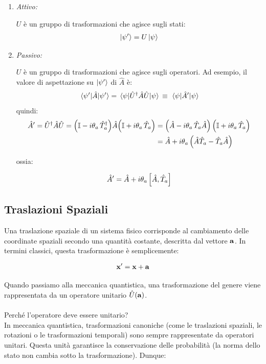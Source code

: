 \begin{enumerate}[label=\arabic*)]
	
	\item \textit{Attivo:}
	
		$U$ è un gruppo di trasformazioni che agisce sugli stati:
	\begin{align*}
		\ket{\psi'} = U \ket{\psi}
	\end{align*}
	
	\item \textit{Passivo:}
	
		$U$ è un gruppo di trasformazioni che agisce sugli operatori. Ad esempio, il valore di aspettazione su $\ket{\psi'}$ di $\hat{A}$ è:
	\begin{align*}
		\mel{\psi'}{\hat{A}}{\psi'} = \mel{\psi}{ \hat{U}^{\dagger} \hat{A} \hat{U}}{\psi} \, \equiv \, \mel{\psi}{\hat{A}'}{\psi}
	\end{align*}
		quindi:
	\begin{align*}
		\hat{A}' = \hat{U}^{\dagger}\hat{A}\hat{U} = \qty( \mathbb{I} - i \theta_a \, \hat{T}_a^{\dagger}) \hat{A} \qty( \mathbb{I} + i \theta_a \, \hat{T}_a) & = \qty( \hat{A} - i \theta_a \, \hat{T}_a \hat{A}) \,  \qty( \mathbb{I} + i \theta_a \, \hat{T}_a)  \\
		& =  \hat{A} + i \theta_a \, \qty(\hat{A} \hat{T}_a - \hat{T}_a \hat{A} )
	\end{align*}

	ossia:

	\begin{align*}
		\hat{A}' = \hat{A} + i \theta_a \, \qty[\hat{A}, \hat{T}_a ]
	\end{align*}
\end{enumerate}

\subsection{Traslazioni Spaziali}

	Una traslazione spaziale di un sistema fisico corrisponde al cambiamento delle coordinate spaziali secondo una quantità costante, descritta dal vettore $\vb{a}$. In termini classici, questa trasformazione è semplicemente:

\begin{align*}
	\vb{x}' = \vb{x} + \vb{a}  
\end{align*}

	Quando passiamo alla meccanica quantistica, una trasformazione del genere viene rappresentata da un operatore unitario $\hat{U}(\vb{a})$. 
	\\
	\\
	Perché l'operatore deve essere unitario?
	\\
	In meccanica quantistica, trasformazioni canoniche (come le traslazioni spaziali, le rotazioni o le trasformazioni temporali) sono sempre rappresentate da operatori unitari. Questa unità garantisce la conservazione delle probabilità (la norma dello stato non cambia sotto la trasformazione). Dunque:

